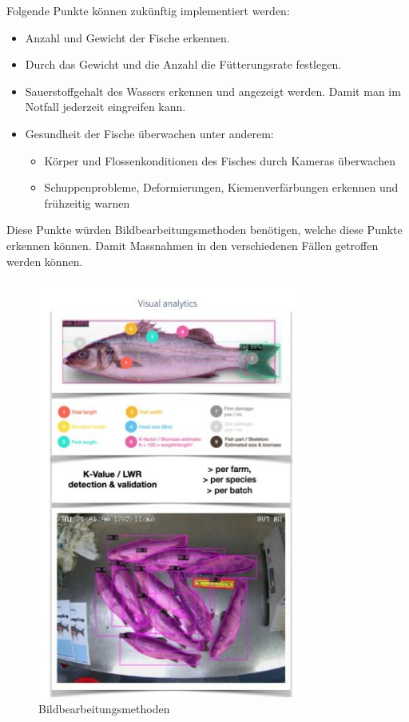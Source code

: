 \documentclass[../main.tex]{subfiles}
\begin{document}
	Folgende Punkte können zukünftig implementiert werden:
	\begin{itemize}
		\item Anzahl und Gewicht der Fische erkennen.
		\item Durch das Gewicht und die Anzahl die Fütterungsrate festlegen.
		\item Sauerstoffgehalt des Wassers erkennen und angezeigt werden. Damit man im Notfall jederzeit eingreifen kann.
		\item Gesundheit der Fische überwachen unter anderem:
		\begin{itemize}
			\item Körper und Flossenkonditionen des Fisches durch Kameras überwachen
			\item Schuppenprobleme, Deformierungen, Kiemenverfärbungen erkennen und frühzeitig warnen
		\end{itemize}
	\end{itemize}	
	Diese Punkte würden Bildbearbeitungsmethoden benötigen, welche diese Punkte erkennen können. Damit Massnahmen in den verschiedenen Fällen getroffen werden können. 
	\par 
	\begin{figure}[H]
		\centering
		\includegraphics{../images/Imageprocessing} 
		\caption{Bildbearbeitungsmethoden}
		\label{fig:Imageprocessing}
	\end{figure}
	
\end{document}
